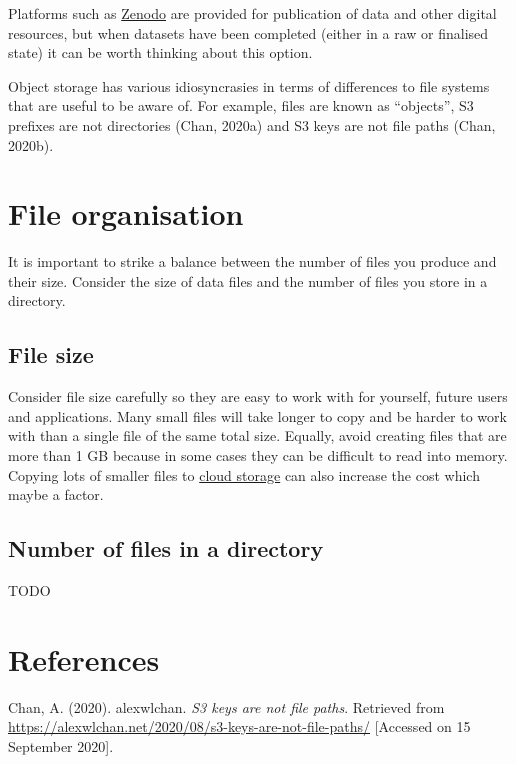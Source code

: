\documentclass[12pt,a4paper,oneside]{report}
\begin{document}
Platforms such as \href{https://zenodo.org}{Zenodo} are provided for
publication of data and other digital resources, but when datasets have
been completed (either in a raw or finalised state) it can be worth
thinking about this option.

Object storage has various idiosyncrasies in terms of differences to
file systems that are useful to be aware of. For example, files are
known as ``objects'', S3 prefixes are not directories (Chan, 2020a) and
S3 keys are not file paths (Chan, 2020b).

\hypertarget{file-organisation}{%
\section{File organisation}\label{file-organisation}}

It is important to strike a balance between the number of files you
produce and their size. Consider the size of data files and the number
of files you store in a directory.

\hypertarget{file-size}{%
\subsection{File size}\label{file-size}}

Consider file size carefully so they are easy to work with for yourself,
future users and applications. Many small files will take longer to copy
and be harder to work with than a single file of the same total size.
Equally, avoid creating files that are more than 1 GB because in some
cases they can be difficult to read into memory. Copying lots of smaller
files to \protect\hyperlink{cloud-storage}{cloud storage} can also
increase the cost which maybe a factor.

\hypertarget{number-of-files-in-a-directory}{%
\subsection{Number of files in a
directory}\label{number-of-files-in-a-directory}}

TODO

\hypertarget{references}{%
\section{References}\label{references}}

Chan, A. (2020). alexwlchan. \emph{S3 keys are not file paths}.
Retrieved from
\url{https://alexwlchan.net/2020/08/s3-keys-are-not-file-paths/}
{[}Accessed on 15 September 2020{]}.
\end{document}
